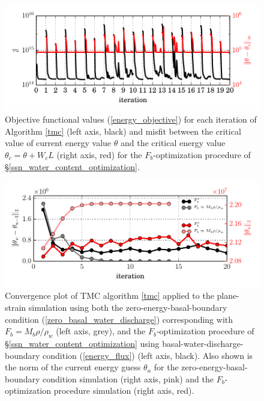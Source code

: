 

\begin{figure}
  \centering
    \includegraphics[width=\linewidth]{images/tmc/plane_strain/opt_convergence.pdf}
    \caption[Plane-strain water-optimization convergence diagram]{Objective functional values (\ref{energy_objective}) for each iteration of Algorithm \ref{tmc} (left axis, black) and misfit between the critical value of current energy value $\theta$ and the critical energy value $\theta_c = \theta + W_c L$ (right axis, red) for the $F_b$-optimization procedure of \S \ref{ssn_water_content_optimization}.}
  \label{opt_convergence_image}
\end{figure}
    
\begin{figure}
  \centering
    \includegraphics[width=\linewidth]{images/tmc/plane_strain/tmc_convergence.pdf}
    \caption[Plane-strain TMC convergence diagram]{Convergence plot of TMC algorithm \ref{tmc} applied to the plane-strain simulation using both the zero-energy-basal-boundary condition (\ref{zero_basal_water_discharge}) corresponding with $F_b = M_b \rho/\rho_w$ (left axis, grey), and the $F_b$-optimization procedure of \S \ref{ssn_water_content_optimization} using basal-water-discharge-boundary condition (\ref{energy_flux}) (left axis, black).  Also shown is the norm of the current energy guess $\theta_n$ for the zero-energy-basal-boundary condition simulation (right axis, pink) and the $F_b$-optimization procedure simulation (right axis, red).} 
  \label{tmc_convergence_image}
\end{figure}

